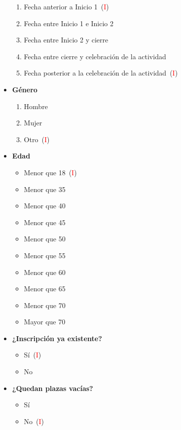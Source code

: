 \begin{itemize}
		\begin{enumerate}
			\item Fecha anterior a Inicio 1~(\textcolor{red}{I})
			\item Fecha entre Inicio 1 e Inicio 2
			\item Fecha entre Inicio 2 y cierre
			\item Fecha entre cierre y celebración de la actividad
			\item Fecha posterior a la celebración de la actividad~(\textcolor{red}{I})
		\end{enumerate}
	\item \textbf{Género}
		\begin{enumerate}
			\item Hombre
			\item Mujer
			\item Otro~(\textcolor{red}{I})
		\end{enumerate}
	\item \textbf{Edad}
		\begin{itemize}
			\item Menor que 18~(\textcolor{red}{I})
			\item Menor que 35
			\item Menor que 40
			\item Menor que 45
			\item Menor que 50
			\item Menor que 55
			\item Menor que 60
			\item Menor que 65
			\item Menor que 70
			\item Mayor que 70
		\end{itemize}
	\item \textbf{¿Inscripción ya existente?}
			\begin{itemize}
				\item Sí~(\textcolor{red}{I})
				\item No
			\end{itemize}
	\item \textbf{¿Quedan plazas vacías?}
			\begin{itemize}
				\item Sí
				\item No~(\textcolor{red}{I})
			\end{itemize}
\end{itemize}

